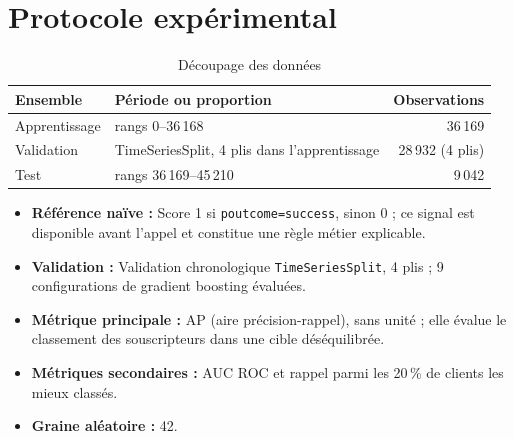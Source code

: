 \documentclass[11pt,a4paper]{article}
\begin{document}
\section{Protocole expérimental}
\label{sec:protocole}
\begin{table}[htbp]
  \centering
  \caption{Découpage des données}
  \label{tab:decoupage}
  \small
  \begin{tabular}{@{}l l r@{}}
    \toprule
    Ensemble & Période ou proportion & Observations \\
    \midrule
    Apprentissage & rangs 0--36\,168 & 36\,169 \\
    Validation & TimeSeriesSplit, 4 plis dans l'apprentissage & 28\,932 (4 plis) \\
    Test & rangs 36\,169--45\,210 & 9\,042 \\
    \bottomrule
  \end{tabular}
\end{table}

\begin{itemize}
  \item \textbf{Référence naïve :} Score 1 si \texttt{poutcome=success}, sinon 0 ; ce signal est disponible avant l'appel et constitue une règle métier explicable.
  \item \textbf{Validation :} Validation chronologique \texttt{TimeSeriesSplit}, 4 plis ; 9 configurations de gradient boosting évaluées.
  \item \textbf{Métrique principale :} AP (aire précision-rappel), sans unité ; elle évalue le classement des souscripteurs dans une cible déséquilibrée.
  \item \textbf{Métriques secondaires :} AUC ROC et rappel parmi les 20\,\% de clients les mieux classés.
  \item \textbf{Graine aléatoire :} 42.
\end{itemize}

\end{document}

